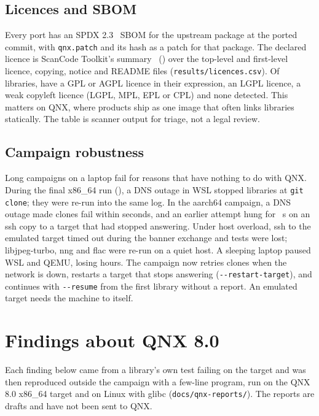 \documentclass[conference]{IEEEtran}
\begin{document}
\subsection{Licences and SBOM}\label{sec:eval-licences}
Every port has an SPDX 2.3~\cite{spdx} SBOM for the upstream package at the ported commit, with
\texttt{qnx.patch} and its hash as a patch for that package. The declared licence is ScanCode Toolkit's
summary~\cite{scancode} () over the top-level and first-level licence, copying, notice and
README files (\texttt{results/licences.csv}). Of  libraries,  have a GPL or AGPL licence
in their expression,  an LGPL licence,  a weak copyleft licence (LGPL, MPL, EPL or CPL)
and  none detected. This matters on QNX, where products ship as one image that often links libraries
statically. The table is scanner output for triage, not a legal review.

\subsection{Campaign robustness}\label{sec:robust}
Long campaigns on a laptop fail for reasons that have nothing to do with QNX. During the final x86\_64 run
(), a DNS outage in WSL stopped  libraries at \texttt{git clone}; they were re-run
into the same log. In the aarch64 campaign, a DNS outage made  clones fail within seconds, and an
earlier attempt hung for ~s on an ssh copy to a target that had stopped answering. Under
host overload, ssh to the emulated target timed out during the banner exchange and tests were lost; libjpeg-turbo,
nng and flac were re-run on a quiet host. A sleeping laptop paused WSL and QEMU, losing  hours. The
campaign now retries clones when the network is down, restarts a target that stops answering
(\texttt{-{}-restart-target}), and continues with \texttt{-{}-resume} from the first library without a report. An
emulated target needs the machine to itself.

\section{Findings about QNX 8.0}\label{sec:findings}

Each finding below came from a library's own test failing on the target and was then reproduced outside the
campaign with a few-line program, run on the QNX 8.0 x86\_64 target and on Linux with glibc
(\texttt{docs/qnx-reports/}). The reports are drafts and have not been sent to QNX.
\end{document}
